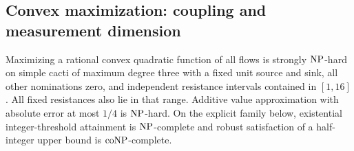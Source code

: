 \subsection{Convex maximization: coupling and measurement dimension}

\begin{theorem}
\label{thm:a-design-maxcut}
Maximizing a rational convex quadratic function of all flows is
strongly $\mathrm{NP}$-hard on simple cacti of maximum degree three with a
fixed unit source and sink, all other nominations zero, and independent
resistance intervals contained in $[1,16]$.  All fixed resistances
also lie in that range.  Additive value approximation with absolute
error at most $1/4$ is $\mathrm{NP}$-hard.  On the explicit family below,
existential integer-threshold attainment is $\mathrm{NP}$-complete and robust
satisfaction of a half-integer upper bound is $\mathrm{coNP}$-complete.
\end{theorem}

